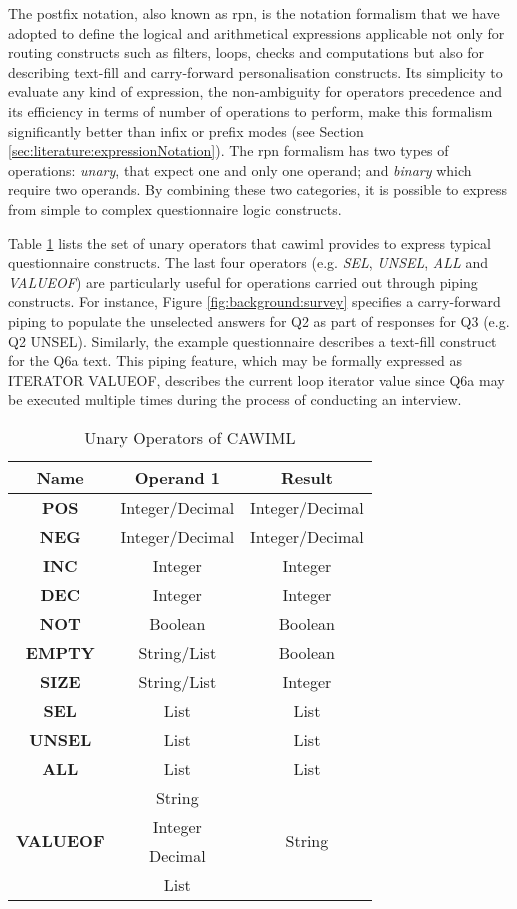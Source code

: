     The postfix notation, also known as \gls{rpn}, is the notation formalism that we have adopted to define the logical and arithmetical expressions applicable not only for routing constructs such as filters, loops, checks and computations but also for describing text-fill and carry-forward personalisation constructs. Its simplicity to evaluate any kind of expression, the non-ambiguity for operators precedence and its efficiency in terms of number of operations to perform, make this formalism significantly better than infix or prefix modes (see Section \ref{sec:literature:expressionNotation}). The \gls{rpn} formalism has two types of operations: \emph{unary}, that expect one and only one operand; and \emph{binary} which require two operands. By combining these two categories, it is possible to express from simple to complex questionnaire logic constructs.

    Table \ref{tab:design:rpnunary} lists the set of unary operators that \gls{cawiml} provides to express typical questionnaire constructs. The last four operators (e.g. \emph{SEL}, \emph{UNSEL}, \emph{ALL} and \emph{VALUEOF}) are particularly useful for operations carried out through piping constructs. For instance, Figure \ref{fig:background:survey} specifies a carry-forward piping to populate the unselected answers for Q2 as part of responses for Q3 (e.g. Q2 UNSEL). Similarly, the example questionnaire describes a text-fill construct for the Q6a text. This piping feature, which may be formally expressed as ITERATOR VALUEOF, describes the current loop iterator value since Q6a may be executed multiple times during the process of conducting an interview.

    \begin{table}
    \begin{center}
    \begin{tabular}{|c|c|c|}
    \hline 
    \textbf{Name} & \textbf{Operand 1} & \textbf{Result}\tabularnewline
    \hline 
    \hline 
    \textbf{POS} & Integer/Decimal & Integer/Decimal\tabularnewline
    \hline 
    \textbf{NEG} & Integer/Decimal & Integer/Decimal\tabularnewline
    \hline 
    \textbf{INC} & Integer & Integer\tabularnewline
    \hline 
    \textbf{DEC} & Integer & Integer\tabularnewline
    \hline 
    \textbf{NOT} & Boolean & Boolean\tabularnewline
    \hline 
    \textbf{EMPTY} & String/List & Boolean\tabularnewline
    \hline 
    \textbf{SIZE} & String/List & Integer\tabularnewline
    \hline 
    \textbf{SEL} & List & List\tabularnewline
    \hline 
    \textbf{UNSEL} & List & List\tabularnewline
    \hline 
    \textbf{ALL} & List & List\tabularnewline
    \hline 
    \multirow{4}{*}{\textbf{VALUEOF}} & String & \multirow{4}{*}{String}\tabularnewline
    \cline{2-2} 
     & Integer & \tabularnewline
    \cline{2-2} 
     & Decimal & \tabularnewline
    \cline{2-2} 
     & List & \tabularnewline
    \hline 
    \end{tabular}
    \caption{Unary Operators of CAWIML}
    \label{tab:design:rpnunary}
    \end{center}
    \end{table}

